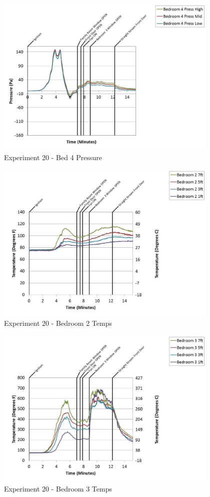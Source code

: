 \documentclass{article}
\begin{document}
\begin{appendices}
	\begin{figure}[h!]
		\centering
		\includegraphics[height=3.05in]{0_Images/Results_Charts/Exp_20_Charts/Bed4Pressure.pdf}
		\caption{Experiment 20 - Bed 4 Pressure}
	\end{figure}
 
	\clearpage

	\begin{figure}[h!]
		\centering
		\includegraphics[height=3.05in]{0_Images/Results_Charts/Exp_20_Charts/Bedroom2Temps.pdf}
		\caption{Experiment 20 - Bedroom 2 Temps}
	\end{figure}
 

	\begin{figure}[h!]
		\centering
		\includegraphics[height=3.05in]{0_Images/Results_Charts/Exp_20_Charts/Bedroom3Temps.pdf}
		\caption{Experiment 20 - Bedroom 3 Temps}
	\end{figure}
 

\end{appendices}
\end{document}
